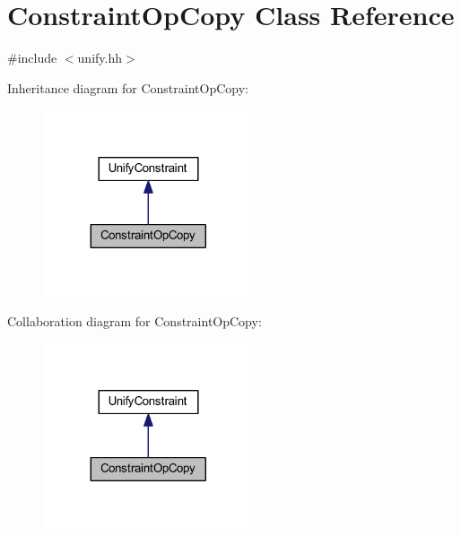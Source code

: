 \hypertarget{class_constraint_op_copy}{}\section{Constraint\+Op\+Copy Class Reference}
\label{class_constraint_op_copy}


{\ttfamily \#include $<$unify.\+hh$>$}



Inheritance diagram for Constraint\+Op\+Copy\+:
\nopagebreak
\begin{figure}[H]
\begin{center}
\leavevmode
\includegraphics[width=176pt]{class_constraint_op_copy__inherit__graph}
\end{center}
\end{figure}


Collaboration diagram for Constraint\+Op\+Copy\+:
\nopagebreak
\begin{figure}[H]
\begin{center}
\leavevmode
\includegraphics[width=176pt]{class_constraint_op_copy__coll__graph}
\end{center}
\end{figure}
